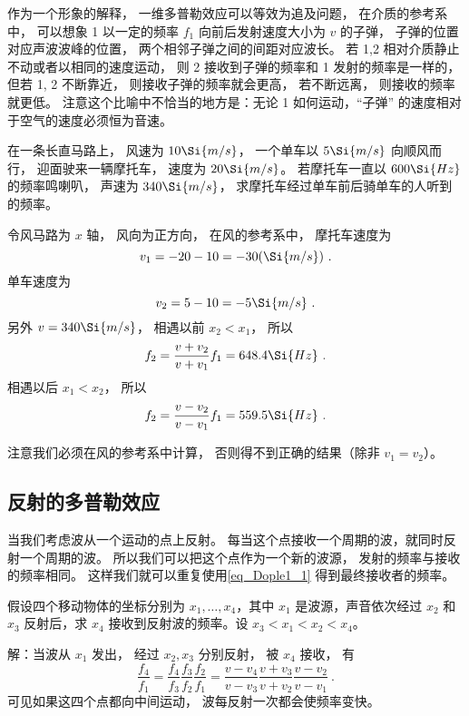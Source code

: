 作为一个形象的解释， 一维多普勒效应可以等效为追及问题， 在介质的参考系中， 可以想象 1 以一定的频率 $f_1$ 向前后发射速度大小为 $v$ 的子弹， 子弹的位置对应声波波峰的位置， 两个相邻子弹之间的间距对应波长。 若 1,2 相对介质静止不动或者以相同的速度运动， 则 2 接收到子弹的频率和 1 发射的频率是一样的， 但若 1, 2 不断靠近， 则接收子弹的频率就会更高， 若不断远离， 则接收的频率就更低。 注意这个比喻中不恰当的地方是：无论 1 如何运动，“子弹” 的速度相对于空气的速度必须恒为音速。

\begin{exercise}{}
在一条长直马路上， 风速为 $10\Si{m/s}$， 一个单车以 $5\Si{m/s}$ 向顺风而行， 迎面驶来一辆摩托车， 速度为 $20\Si{m/s}$。 若摩托车一直以 $600\Si{Hz}$ 的频率鸣喇叭， 声速为 $340\Si{m/s}$， 求摩托车经过单车前后骑单车的人听到的频率。

令风马路为 $x$ 轴， 风向为正方向， 在风的参考系中， 摩托车速度为
\begin{equation}
v_1 = -20 - 10 = -30(\Si{m/s})~.
\end{equation}
单车速度为
\begin{equation}
v_2 = 5 - 10 = -5\Si{m/s}~.
\end{equation}
另外 $v = 340\Si{m/s}$， 相遇以前 $x_2 < x_1$， 所以
\begin{equation}
f_2 = \frac{v + v_2}{v + v_1} f_1 = 648.4\Si{Hz}~.
\end{equation}
相遇以后 $x_1 < x_2$， 所以
\begin{equation}
f_2 = \frac{v - v_2}{v - v_1} f_1 = 559.5\Si{Hz}~.
\end{equation}
\end{exercise}
注意我们必须在风的参考系中计算， 否则得不到正确的结果（除非 $v_1 = v_2$）。

\subsection{反射的多普勒效应}
当我们考虑波从一个运动的点上反射。 每当这个点接收一个周期的波，就同时反射一个周期的波。 所以我们可以把这个点作为一个新的波源， 发射的频率与接收的频率相同。 这样我们就可以重复使用\autoref{eq_Dople1_1} 得到最终接收者的频率。

\begin{example}{}
假设四个移动物体的坐标分别为 $x_1,\dots,x_4$，其中 $x_1$ 是波源，声音依次经过 $x_2$ 和 $x_3$ 反射后，求 $x_4$ 接收到反射波的频率。设 $x_3 < x_1 < x_2 < x_4$。

解：当波从 $x_1$ 发出， 经过 $x_2, x_3$ 分别反射， 被 $x_4$ 接收， 有
\begin{equation}
\frac{f_4}{f_1} = \frac{f_4}{f_3}\frac{f_3}{f_2}\frac{f_2}{f_1}
= \frac{v - v_4}{v - v_3}\frac{v + v_3}{v + v_2}\frac{v - v_2}{v - v_1}~.
\end{equation}
可见如果这四个点都向中间运动， 波每反射一次都会使频率变快。
\end{example}

